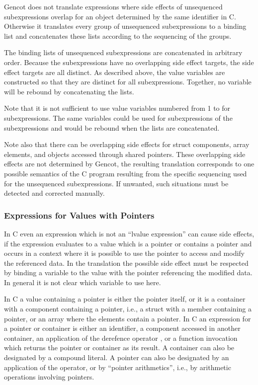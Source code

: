 Gencot does not translate expressions where side effects of unsequenced subexpressions overlap for an object determined 
by the same identifier in C. Otherwise it translates every group of unsequenced subexpressions to a binding list
and concatenates these lists according to the sequencing of the groups.

The binding lists of unsequenced subexpressions are concatenated in arbitrary order. Because the subexpressions have no
overlapping side effect targets, the side effect targets are all distinct. As described above, the value variables are 
constructed so that they are distinct for all subexpressions. Together, no variable will be rebound by concatenating the lists. 

Note that it is not sufficient to use value variables numbered from 1 to  for  subexpressions. The same variables
could be used for subexpressions of the subexpressions and would be rebound when the lists are concatenated.

Note also that there can be overlapping side effects for struct components, array elements, and objects accessed through
shared pointers. These overlapping side effects are not determined by Gencot, the resulting translation corresponds to
one possible semantics of the C program resulting from the specific sequencing used for the unsequenced subexpressions. 
If unwanted, such situations must be detected and corrected manually.

\subsubsection{Expressions for Values with Pointers}

In C even an expression which is not an ``lvalue expression'' can cause side effects, if the expression evaluates to a 
value which is a pointer or contains a pointer and occurs in a context where it is possible to use the pointer to access 
and modify the referenced data. In the translation the possible side effect must be respected by binding a variable to the 
value with the pointer referencing the modified data. In general it is not clear which variable to use here.

In C a value containing a pointer is either the pointer itself, or it is a container with a component containing a pointer,
i.e., a struct with a member containing a pointer, or an array where the elements contain a pointer. In C an expression
for a pointer or container is either an identifier, a component accessed in another container, an application of the derefence
operator \code{*}, or a function invocation which 
returns the pointer or container as its result. A container can also be designated by a compound literal. A pointer can also
be designated by an application of the \code{\&} operator, or by ``pointer arithmetics'', i.e., by arithmetic operations 
involving pointers.


